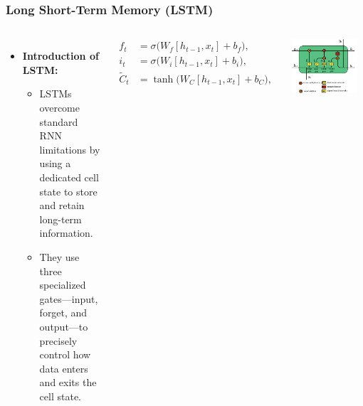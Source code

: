 \documentclass{beamer}
\begin{document}
\begin{frame}
    \frametitle{Long Short-Term Memory (LSTM)}
    \vspace{0cm}
    
    \begin{columns}[T]
        \begin{itemize}
            \item \textbf{Introduction of LSTM:}
            \begin{itemize}
                \item LSTMs overcome standard RNN limitations by using a dedicated cell state to store and retain long-term information.
                \item They use three specialized gates—input, forget, and output—to precisely control how data enters and exits the cell state.
            \end{itemize}
        \end{itemize}

        \vspace{-0.4cm}
        {\small
        \[
        \begin{aligned}
            f_t &= \sigma\bigl(W_f [h_{t-1}, x_t] + b_f\bigr),\\[5pt]
            i_t &= \sigma\bigl(W_i [h_{t-1}, x_t] + b_i\bigr),\\[5pt]
            \tilde{C}_t &= \tanh\bigl(W_C [h_{t-1}, x_t] + b_C\bigr),
        \end{aligned}
        \]
        }
        
        \raggedright
        \includegraphics[width=0.9\textwidth]{LSTM.png}
        \vspace{-0.15cm}
        

\end{columns}
\end{frame}
\end{document}
